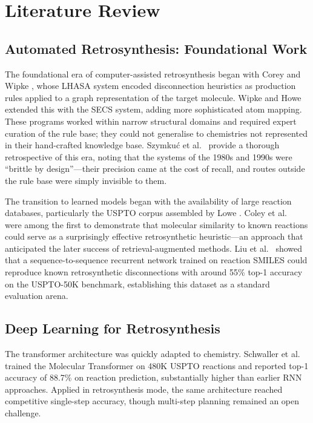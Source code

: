 \documentclass[12pt,a4paper]{article}
\begin{document}
\section{Literature Review}

\subsection{Automated Retrosynthesis: Foundational Work}

The foundational era of computer-assisted retrosynthesis began with Corey and
Wipke \cite{corey1969lhasa}, whose LHASA system encoded disconnection
heuristics as production rules applied to a graph representation of the target
molecule. Wipke and Howe \cite{wipke1977secs} extended this with the SECS
system, adding more sophisticated atom mapping. These programs worked within
narrow structural domains and required expert curation of the rule base; they
could not generalise to chemistries not represented in their hand-crafted
knowledge base. Szymku{\'c} et al.~\cite{szymkuc2016casp} provide a thorough
retrospective of this era, noting that the systems of the 1980s and 1990s
were ``brittle by design''—their precision came at the cost of recall, and
routes outside the rule base were simply invisible to them.

The transition to learned models began with the availability of large reaction
databases, particularly the USPTO corpus assembled by Lowe
\cite{lowe2012uspto}. Coley et al.~\cite{coley2017synthesis} were among the
first to demonstrate that molecular similarity to known reactions could serve as
a surprisingly effective retrosynthetic heuristic—an approach that anticipated
the later success of retrieval-augmented methods. Liu et
al.~\cite{liu2017retrosynthesis} showed that a sequence-to-sequence recurrent
network trained on reaction SMILES could reproduce known retrosynthetic
disconnections with around 55\% top-1 accuracy on the USPTO-50K benchmark,
establishing this dataset as a standard evaluation arena.

\subsection{Deep Learning for Retrosynthesis}

The transformer architecture \cite{vaswani2017attention} was quickly adapted to
chemistry. Schwaller et al.~\cite{schwaller2019molecular} trained the Molecular
Transformer on 480K USPTO reactions and reported top-1 accuracy of 88.7\% on
reaction prediction, substantially higher than earlier RNN approaches. Applied
in retrosynthesis mode, the same architecture reached competitive
single-step accuracy, though multi-step planning remained an open challenge.
\end{document}
